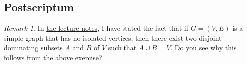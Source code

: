 \documentclass[paper=a4, fontsize=12pt]{scrartcl} %
\newcommand{\tup}[1]{\left( #1 \right)}
\theoremstyle{plainsl}
\theoremstyle{definition}
\theoremstyle{remark}
\newtheorem{remark}[theorem]{Remark}
\begin{document}
\subsection{Postscriptum}

\begin{remark}
In
\href{http://www.cip.ifi.lmu.de/~grinberg/t/17s/nogra.pdf}{the lecture notes},
I have stated the fact that
if $G = \tup{V, E}$ is a simple graph that has no isolated vertices,
then there exist two disjoint dominating subsets $A$ and $B$
of $V$ such that $A \cup B = V$. Do you see why this follows from
the above exercise?
\end{remark}

\end{document}
